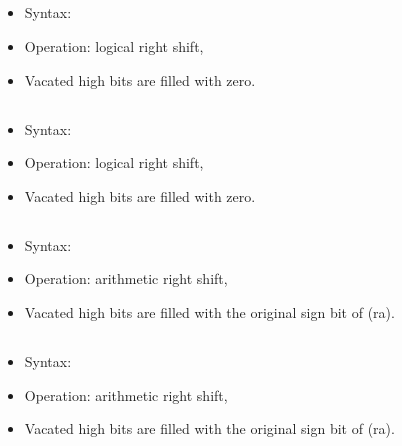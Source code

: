 \subsection{}

\begin{itemize}
\item Syntax: 
\item Operation: logical right shift, 
\item Vacated high bits are filled with zero.
\end{itemize}

\subsection{}

\begin{itemize}
\item Syntax: 
\item Operation: logical right shift, 
\item Vacated high bits are filled with zero.
\end{itemize}

\subsection{}

\begin{itemize}
\item Syntax: 
\item Operation: arithmetic right shift, 
\item Vacated high bits are filled with the original sign bit of (ra).
\end{itemize}

\subsection{}

\begin{itemize}
\item Syntax: 
\item Operation: arithmetic right shift, 
\item Vacated high bits are filled with the original sign bit of (ra).
\end{itemize}

